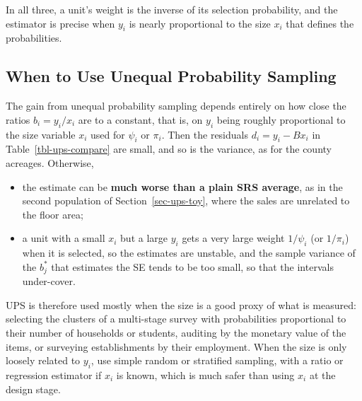 \documentclass[
  letterpaper,
  DIV=11,
  numbers=noendperiod]{scrreprt}
\providecommand{\tightlist}{%
  \setlength{\itemsep}{0pt}\setlength{\parskip}{0pt}}
\renewcommand{\[}{\begin{equation}}
\renewcommand{\]}{\end{equation}}
\begin{document}
In all three, a unit's weight is the inverse of its selection
probability, and the estimator is precise when \(y_i\) is nearly
proportional to the size \(x_i\) that defines the probabilities.

\subsection{When to Use Unequal Probability
Sampling}\label{sec-ups-when}

\begin{tcolorbox}[enhanced jigsaw, arc=.35mm, bottomrule=.15mm, bottomtitle=1mm, breakable, colback=white, colbacktitle=quarto-callout-warning-color!10!white, colframe=quarto-callout-warning-color-frame, coltitle=black, left=2mm, leftrule=.75mm, opacityback=0, opacitybacktitle=0.6, rightrule=.15mm, title=\textcolor{quarto-callout-warning-color}{\faExclamationTriangle}\hspace{0.5em}{Remark: UPS is risky unless y is tied to the size variable}, titlerule=0mm, toprule=.15mm, toptitle=1mm]

The gain from unequal probability sampling depends entirely on how close
the ratios \(b_i=y_i/x_i\) are to a constant, that is, on \(y_i\) being
roughly proportional to the size variable \(x_i\) used for \(\psi_i\) or
\(\pi_i\). Then the residuals \(d_i=y_i-Bx_i\) in
Table~\ref{tbl-ups-compare} are small, and so is the variance, as for
the county acreages. Otherwise,

\begin{itemize}
\tightlist
\item
  the estimate can be \textbf{much worse than a plain SRS average}, as
  in the second population of Section~\ref{sec-ups-toy}, where the sales
  are unrelated to the floor area;
\item
  a unit with a small \(x_i\) but a large \(y_i\) gets a very large
  weight \(1/\psi_i\) (or \(1/\pi_i\)) when it is selected, so the
  estimates are unstable, and the sample variance of the \(b_j^*\) that
  estimates the SE tends to be too small, so that the intervals
  under-cover.
\end{itemize}

UPS is therefore used mostly when the size is a good proxy of what is
measured: selecting the clusters of a multi-stage survey with
probabilities proportional to their number of households or students,
auditing by the monetary value of the items, or surveying establishments
by their employment. When the size is only loosely related to \(y_i\),
use simple random or stratified sampling, with a ratio or regression
estimator if \(x_i\) is known, which is much safer than using \(x_i\) at
the design stage.

\end{tcolorbox}
\end{document}
